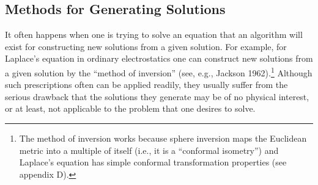 
\subsection{Methods for Generating Solutions}\label{sec:7.4}

It often happens when one is trying to solve an equation that an algorithm will exist
for constructing new solutions from a given solution. For example, for Laplace's
equation in ordinary electrostatics one can construct new solutions from a given
solution by the “method of inversion” (see, e.g., Jackson 1962).\footnote{The
method of inversion works because sphere inversion maps the Euclidean metric into
a multiple of itself (i.e., it is a “conformal isometry”) and Laplace's equation has
simple conformal transformation properties (see appendix D).} Although such
prescriptions often can be applied readily, they usually suffer from the serious
drawback that the solutions they generate may be of no physical interest, or at least,
not applicable to the problem that one desires to solve.

